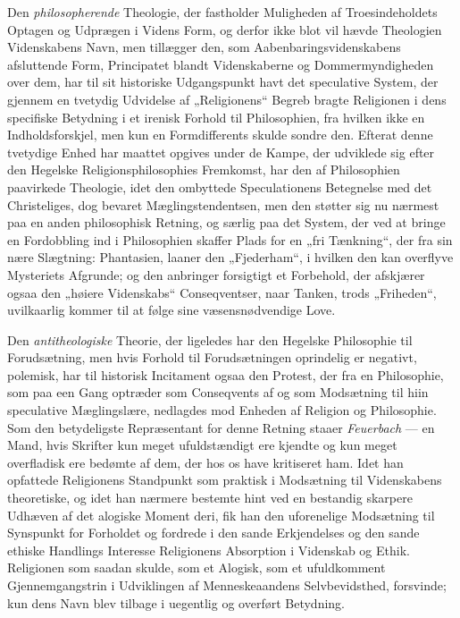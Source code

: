 \documentclass[12pt,a4paper]{book}
\newcommand{\opage}[1]{\marginnote{\footnotesize\textit{[#1]}}}
\begin{document}
Den \emph{philosopherende} Theologie, der fastholder Muligheden af
Troesindeholdets Optagen og Udprægen i Videns Form, og derfor ikke
blot vil hævde Theologien Videnskabens Navn, men tillægger den, som
Aabenbaringsvidenskabens afsluttende Form, Principatet blandt
Videnskaberne og Dommermyndigheden over dem, har til sit historiske
Udgangspunkt havt det speculative System, der gjennem en tvetydig
Udvidelse af „Religionens“ Begreb bragte Religionen i dens specifiske
Betydning i et irenisk Forhold til Philosophien, fra hvilken ikke en
Indholdsforskjel, men kun en Formdifferents skulde sondre den.
Efterat denne tvetydige Enhed har maattet opgives under de Kampe, der
udviklede sig efter den Hegelske Religionsphilosophies Fremkomst, har
den af Philosophien paavirkede Theologie, idet den ombyttede
Speculationens Betegnelse med det Christeliges, dog bevaret
Mæglingstendentsen, men den støtter sig nu nærmest paa en anden
philosophisk Retning, og særlig paa det System, der ved at bringe en
Fordobbling ind i Philosophien skaffer Plads for en „fri Tænkning“,
der fra sin nære Slægtning: Phantasien, laaner den „Fjederham“, i hvilken den kan overflyve Mysteriets Afgrunde; og den anbringer
forsigtigt et Forbehold, der afskjærer ogsaa den „høiere Videnskabs“
Conseqventser, naar Tanken, trods „Friheden“, uvilkaarlig kommer til
at følge sine væsensnødvendige Love.

Den \emph{antitheologiske} Theorie, der ligeledes har den Hegelske Philosophie
til Forudsætning, men hvis Forhold til Forudsætningen oprindelig er
negativt, polemisk, har \opage{3}til historisk Incitament ogsaa den Protest,
der fra en Philosophie, som paa een Gang optræder som Conseqvents af
og som Modsætning til hiin speculative Mæglingslære, nedlagdes mod
Enheden af Religion og Philosophie. Som den betydeligste Repræsentant
for denne Retning staaer \emph{Feuerbach} --- en Mand, hvis Skrifter kun
meget ufuldstændigt ere kjendte og kun meget overfladisk ere bedømte
af dem, der hos os have kritiseret ham. Idet han opfattede Religionens
Standpunkt som praktisk i Modsætning til Videnskabens theoretiske, og
idet han nærmere bestemte hint ved en bestandig skarpere Udhæven af
det alogiske Moment deri, fik han den uforenelige Modsætning til
Synspunkt for Forholdet og fordrede i den sande Erkjendelses og den
sande ethiske Handlings Interesse Religionens Absorption i Videnskab
og Ethik. Religionen som saadan skulde, som et Alogisk, som et
ufuldkomment Gjennemgangstrin i Udviklingen af Menneskeaandens
Selvbevidsthed, forsvinde; kun dens Navn blev tilbage i uegentlig og
overført Betydning.
\end{document}
